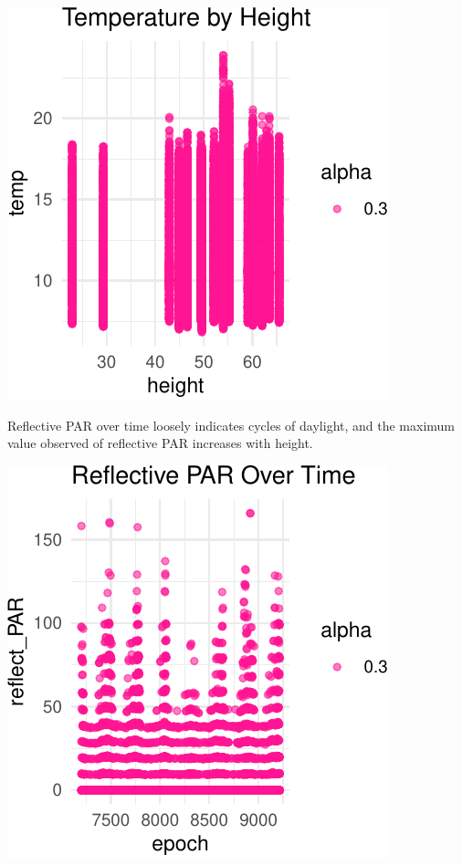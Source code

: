 \documentclass[]{article}
\begin{document}
\begin{center}\includegraphics{Project1WriteUp_files/figure-latex/unnamed-chunk-13-4} \end{center}

Reflective PAR over time loosely indicates cycles of daylight, and the
maximum value observed of reflective PAR increases with height.

\begin{center}\includegraphics{Project1WriteUp_files/figure-latex/unnamed-chunk-14-1} \end{center}
\end{document}
